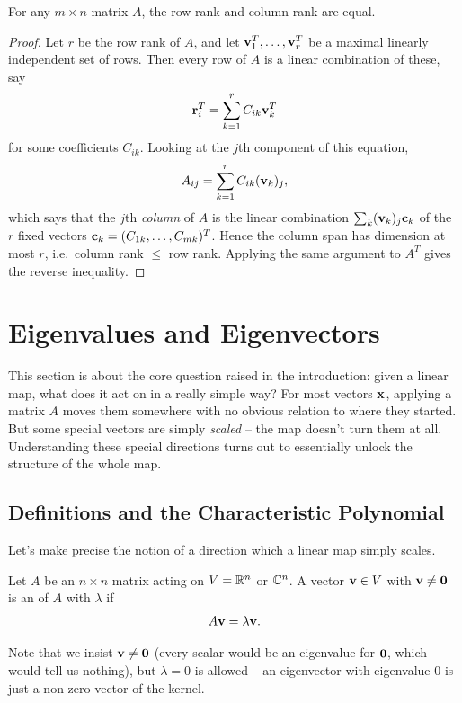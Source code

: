 \documentclass[a4paper]{scrartcl}
\begin{document}
\begin{theorem}
	For any $m \times n$ matrix $A$, the row rank and column rank are equal.
\end{theorem}
\begin{proof}
	Let $r$ be the row rank of $A$, and let $\mathbf{v}_1^T, \dots, \mathbf{v}_r^T$ be a maximal linearly independent set of rows. Then every row of $A$ is a linear combination of these, say
	$$
	\mathbf{r}_i^T = \sum_{k = 1}^r C_{ik}\mathbf{v}_k^T
	$$
	for some coefficients $C_{ik}$. Looking at the $j$th component of this equation,
	$$
	A_{ij} = \sum_{k=1}^r C_{ik}(\mathbf{v}_k)_j,
	$$
	which says that the $j$th \emph{column} of $A$ is the linear combination $\sum_k (\mathbf{v}_k)_j \mathbf{c}_k$ of the $r$ fixed vectors $\mathbf{c}_k = (C_{1k}, \dots, C_{mk})^T$. Hence the column span has dimension at most $r$, i.e.\ column rank $\leq$ row rank. Applying the same argument to $A^T$ gives the reverse inequality.
\end{proof}

\section{Eigenvalues and Eigenvectors}

This section is about the core question raised in the introduction: given a linear map, what does it act on in a really simple way? For most vectors $\mathbf{x}$, applying a matrix $A$ moves them somewhere with no obvious relation to where they started. But some special vectors are simply \emph{scaled} -- the map doesn't turn them at all. Understanding these special directions turns out to essentially unlock the structure of the whole map.

\subsection{Definitions and the Characteristic Polynomial}

Let's make precise the notion of a direction which a linear map simply scales.

\begin{definition}
	Let $A$ be an $n \times n$ matrix acting on $V = \mathbb{R}^n$ or $\mathbb{C}^n$. A vector $\mathbf{v} \in V$ with $\mathbf{v} \neq \mathbf{0}$ is an  of $A$ with  $\lambda$ if
	$$
	A \mathbf{v} = \lambda \mathbf{v}.
	$$
\end{definition}

Note that we insist $\mathbf{v} \neq \mathbf{0}$ (every scalar would be an eigenvalue for $\mathbf{0}$, which would tell us nothing), but $\lambda = 0$ is allowed -- an eigenvector with eigenvalue $0$ is just a non-zero vector of the kernel.
\end{document}
